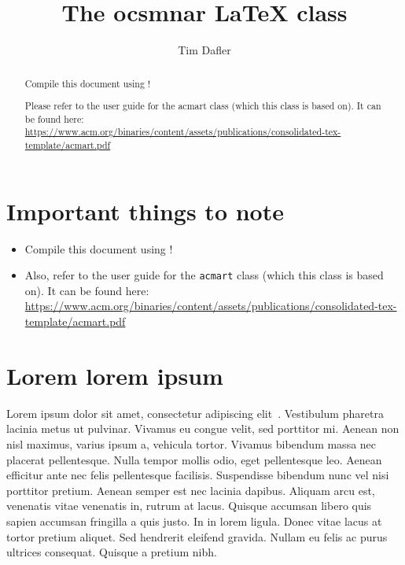 \documentclass{ocsmnar}
\begin{document}
\title{The ocsmnar \LaTeX{} class}






\author{Tim Dafler}


\begin{abstract}
  Compile this document using \XeLaTeX!


  Please refer to the user guide for the acmart class (which this class is based on).
  It can be found here: \url{https://www.acm.org/binaries/content/assets/publications/consolidated-tex-template/acmart.pdf}
\end{abstract}




\maketitle


\section{Important things to note}


\begin{itemize}
  \item Compile this document using \XeLaTeX!
  \item
    Also, refer to the user guide for the \texttt{acmart} class (which this class is based on).
    It can be found here: \url{https://www.acm.org/binaries/content/assets/publications/consolidated-tex-template/acmart.pdf}\sloppy
\end{itemize}


\section{Lorem lorem ipsum}


Lorem ipsum dolor sit amet, consectetur adipiscing elit~\cite{knuth1984}.
Vestibulum pharetra lacinia metus ut pulvinar.
Vivamus eu congue velit, sed porttitor mi.
Aenean non nisl maximus, varius ipsum a, vehicula tortor.
Vivamus bibendum massa nec placerat pellentesque.
Nulla tempor mollis odio, eget pellentesque leo.
Aenean efficitur ante nec felis pellentesque facilisis.
Suspendisse bibendum nunc vel nisi porttitor pretium.
Aenean semper est nec lacinia dapibus.
Aliquam arcu est, venenatis vitae venenatis in, rutrum at lacus.
Quisque accumsan libero quis sapien accumsan fringilla a quis justo.
In in lorem ligula.
Donec vitae lacus at tortor pretium aliquet.
Sed hendrerit eleifend gravida.
Nullam eu felis ac purus ultrices consequat.
Quisque a pretium nibh.
\end{document}
